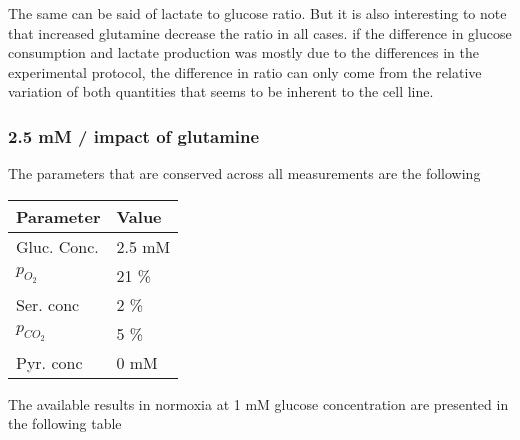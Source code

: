 \documentclass[11pt,a4paper]{article}
\begin{document}

The same can be said of lactate to glucose ratio. But it is also interesting to note that increased glutamine decrease the ratio in all cases. if the difference in glucose consumption and lactate production was mostly due to the differences in the experimental protocol, the difference in ratio can only come from the relative variation of both quantities that seems to be inherent to the cell line.

\subsubsection{2.5 mM / impact of glutamine}
The parameters that are conserved across all measurements are the following\\ 

\begin{table}[h!]
\begin{center}
\begin{tabular}{ |p{25mm}|p{25mm}|}
\hline
\textbf{Parameter} & \textbf{Value} \\
\hline
Gluc. Conc. & 2.5 mM \\
\hline
$p_{O_2}$ & 21 \% \\
\hline
Ser. conc & 2 \% \\
\hline
$p_{CO_2}$ & 5 \% \\
\hline
Pyr. conc & 0 mM \\
\hline
\end{tabular}
\end{center}
\end{table}

The available results in normoxia at 1 mM glucose concentration are presented in the following table 
\end{document}
